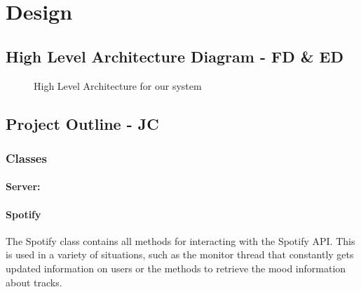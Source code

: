 \documentclass[10pt]{report}
\begin{document}
\chapter{Design}

\section{High Level Architecture Diagram - FD \& ED}

\begin{figure}[h]
	\centering
	\caption{High Level Architecture for our system}
	\label{fig:hla}
\end{figure}

\section{Project Outline - JC}

\subsection{Classes}


\subsubsection{Server:}

\hrulefill

\subsubsection{Spotify}
The Spotify class contains all methods for interacting with the Spotify API. This is used in a variety of situations, such as the monitor thread that constantly gets updated information on users or the methods to retrieve the mood information about tracks. 
\end{document}
